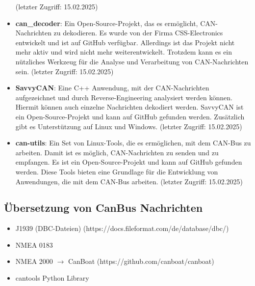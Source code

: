 \begin{itemize}
    \cite{VectorCANoe} (letzter Zugriff: 15.02.2025)
    \item \textbf{can\_decoder}: Ein Open-Source-Projekt, das es ermöglicht, CAN-Nachrichten zu dekodieren. Es wurde von der Firma
    CSS-Electronics entwickelt und ist auf GitHub verfügbar. Allerdings ist das Projekt nicht mehr aktiv und wird nicht mehr
    weiterentwickelt. Trotzdem kann es ein nützliches Werkzeug für die Analyse und Verarbeitung von CAN-Nachrichten sein. 
    \cite{can_decoder} (letzter Zugriff: 15.02.2025)
    \item \textbf{SavvyCAN}: Eine C++ Anwendung, mit der CAN-Nachrichten aufgezeichnet und durch Reverse-Engineering analysiert werden können.
    Hiermit können auch einzelne Nachrichten dekodiert werden. SavvyCAN ist ein Open-Source-Projekt und kann auf GitHub gefunden werden. Zusätzlich
    gibt es Unterstützung auf Linux und Windows. \cite{SavvyCAN} (letzter Zugriff: 15.02.2025)
    \item \textbf{can-utils}: Ein Set von Linux-Tools, die es ermöglichen, mit dem CAN-Bus zu arbeiten. Damit ist es möglich, CAN-Nachrichten zu senden und zu empfangen.
    Es ist ein Open-Source-Projekt und kann auf GitHub gefunden werden. Diese Tools bieten eine Grundlage für die Entwicklung von Anwendungen, die mit dem CAN-Bus arbeiten.
    \cite{can-utils} (letzter Zugriff: 15.02.2025)
\end{itemize}

\subsection{Übersetzung von CanBus Nachrichten}
\begin{itemize}
    \item J1939 (DBC-Dateien) (https://docs.fileformat.com/de/database/dbc/)
    \item NMEA 0183 
    \item NMEA 2000 $\rightarrow$ CanBoat (https://github.com/canboat/canboat)
    \item cantools Python Library 
    
\end{itemize}